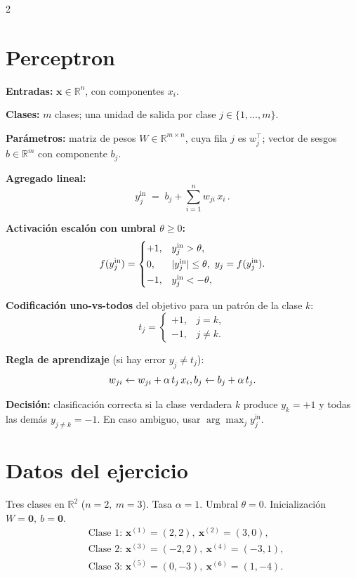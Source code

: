 \documentclass[11pt]{article}
\begin{document}
\begin{multicols}{2}


\section*{Perceptron}

\textbf{Entradas:} $\bm{x}\in\mathbb{R}^n$, con componentes $x_i$.

\textbf{Clases:} $m$ clases; una unidad de salida por clase $j\in\{1,\dots,m\}$.

\textbf{Parámetros:} matriz de pesos $W\in\mathbb{R}^{m\times n}$, cuya fila $j$ es $w_j^\top$; vector de sesgos $b\in\mathbb{R}^m$ con componente $b_j$.

\textbf{Agregado lineal:}
\[
y^{\text{in}}_j \;=\; b_j+\sum_{i=1}^n w_{ji}\,x_i \,.
\]

\textbf{Activación escalón con umbral $\theta\ge 0$:}
\[
f(y^{\text{in}}_j)=
\begin{cases}
+1, & y^{\text{in}}_j>\theta,\\[2pt]
0, & |y^{\text{in}}_j|\le \theta,\\[2pt]
-1, & y^{\text{in}}_j<-\theta,
\end{cases}
\\
y_j=f(y^{\text{in}}_j).
\]

\textbf{Codificación uno-vs-todos} del objetivo para un patrón de la clase $k$:
\[
t_j=\begin{cases}
+1,& j=k,\\
-1,& j\neq k.
\end{cases}
\]

\textbf{Regla de aprendizaje} (si hay error $y_j\neq t_j$):
\[
w_{ji}\leftarrow w_{ji}+\alpha\, t_j\, x_i,
\\
b_j\leftarrow b_j+\alpha\, t_j.
\]

\textbf{Decisión:} clasificación correcta si la clase verdadera $k$ produce $y_k=+1$ y todas las demás $y_{j\neq k}=-1$. En caso ambiguo, usar $\arg\max_j y^{\text{in}}_j$.

\section*{Datos del ejercicio}

Tres clases en $\mathbb{R}^2$ ($n=2,\ m=3$). Tasa $\alpha=1$. Umbral $\theta=0$. Inicialización $W=\mathbf{0},\ b=\mathbf{0}$.
\[
\begin{aligned}
&\text{Clase 1: } \bm{x}^{(1)}=(2,2),\ \bm{x}^{(2)}=(3,0),\\
&\text{Clase 2: } \bm{x}^{(3)}=(-2,2),\ \bm{x}^{(4)}=(-3,1),\\
&\text{Clase 3: } \bm{x}^{(5)}=(0,-3),\ \bm{x}^{(6)}=(1,-4).
\end{aligned}
\]


\end{multicols}
\end{document}
